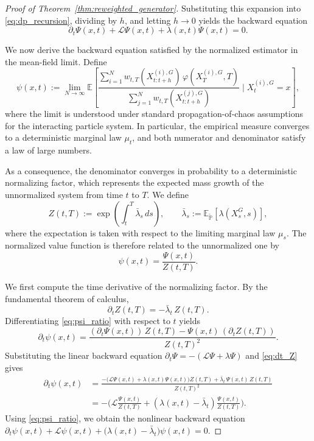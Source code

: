 \documentclass{article}
\theoremstyle{plain}
\theoremstyle{definition}
\theoremstyle{remark}
\newcommand{\E}{\mathbb{E}}
\renewcommand{\P}{{\mathbb{P}}}
\begin{document}
\begin{proof}[Proof of Theorem~\ref{thm:reweighted_generator}]
Substituting this expansion into \eqref{eq:dp_recursion}, dividing by $h$, and letting
$h\to0$ yields the backward equation
\[
\partial_t\Psi(x,t)
+
\mathcal L\Psi(x,t)
+
\lambda(x,t)\Psi(x,t)
=
0.
\]



We now derive the backward equation satisfied by the normalized estimator in the
mean-field limit.
Define
\[
\psi(x,t)
:=
\lim_{N\to\infty}
\E\!\left[
\frac{\sum_{i=1}^N w_{t,T}(X^{(i),G}_{t:t+h})\,\varphi(X_T^{(i),G},T)}
{\sum_{j=1}^N w_{t,T}(X^{(j),G}_{t:t+h})}
\;\Big|\;
X_t^{(i),G}=x
\right],
\]
where the limit is understood under standard propagation-of-chaos assumptions
for the interacting particle system.
In particular, the empirical measure converges to a deterministic marginal law
\(\mu_t\), and both numerator and denominator satisfy a law of large numbers.

As a consequence, the denominator converges in probability to a deterministic
normalizing factor, which represents the expected mass growth of the
unnormalized system from time \(t\) to \(T\).
We define
\[
Z(t,T)
:=
\exp\!\left(
\int_t^T \bar\lambda_s\,ds
\right),
\qquad
\bar\lambda_s
:=
\E_{\tilde{\P}}\!\left[\lambda(X_s^G,s)\right],
\]
where the expectation is taken with respect to the limiting marginal law
\(\mu_s\).
The normalized value function is therefore related to the unnormalized one by
\begin{equation}
\label{eq:psi_ratio}
\psi(x,t)=\frac{\Psi(x,t)}{Z(t,T)}.
\end{equation}

We first compute the time derivative of the normalizing factor.
By the fundamental theorem of calculus,
\begin{equation}
\label{eq:dt_Z}
\partial_t Z(t,T)
=
-\bar\lambda_t\,Z(t,T).
\end{equation}
Differentiating \eqref{eq:psi_ratio} with respect to \(t\) yields
\[
\partial_t\psi(x,t)
=
\frac{
(\partial_t\Psi(x,t))\,Z(t,T)
-
\Psi(x,t)\,(\partial_t Z(t,T))
}{Z(t,T)^2}.
\]
Substituting the linear backward equation
\(
\partial_t\Psi
=
-(\mathcal L\Psi+\lambda\Psi)
\)
and \eqref{eq:dt_Z} gives
\[
\begin{aligned}
\partial_t\psi(x,t)
&=
\frac{
-\big(\mathcal L\Psi(x,t)+\lambda(x,t)\Psi(x,t)\big)Z(t,T)
+
\bar\lambda_t\,\Psi(x,t)\,Z(t,T)
}{Z(t,T)^2}
\\
&=
-\Big(
\mathcal L\frac{\Psi(x,t)}{Z(t,T)}
+
(\lambda(x,t)-\bar\lambda_t)\frac{\Psi(x,t)}{Z(t,T)}
\Big).
\end{aligned}
\]
Using \eqref{eq:psi_ratio}, we obtain the nonlinear backward equation
\(\partial_t\psi(x,t)
+
\mathcal L\psi(x,t)
+
\big(\lambda(x,t)-\bar\lambda_t\big)\psi(x,t)
=
0\).


\end{proof}
\end{document}
